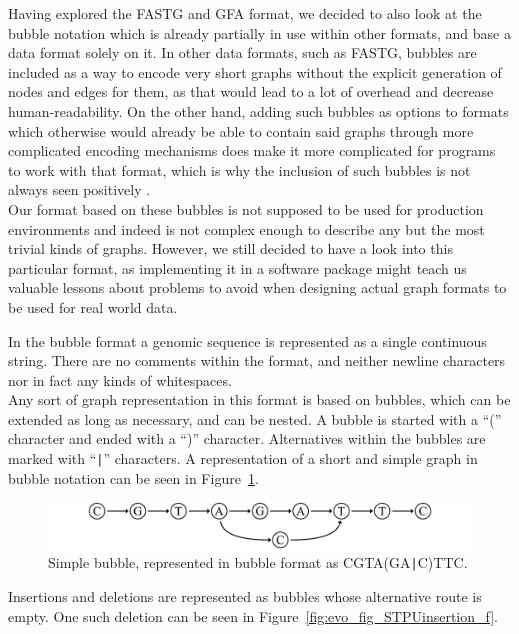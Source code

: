 \documentclass[a4paper,12pt,twoside,BCOR=10mm]{scrbook}
\def\pipe{\texttt{|}}
\begin{document}
Having explored the FASTG and GFA format, we decided to also look
at the bubble notation which is already partially in use within other formats,
and base a data format solely on it.
In other data formats, such as FASTG, bubbles are included as a way to encode very short graphs
without the explicit generation of nodes and edges for them,
as that would lead to a lot of overhead and decrease human-readability.
On the other hand, adding such bubbles as options to formats which otherwise
would already be able to contain said graphs through more complicated encoding mechanisms
does make it more complicated for programs to work with that format, which is why the inclusion
of such bubbles is not always seen positively \citep{specGFA1}. \\
Our format based on these bubbles
is not supposed to be used for production environments and indeed
is not complex enough to describe any but the most trivial kinds of graphs.
However, we still decided to have a look into this particular format,
as implementing it in a software package might teach us valuable lessons
about problems to avoid when designing actual graph formats to be used for real world data.

In the bubble format a genomic sequence is represented as a single continuous string.
There are no comments within the format,
and neither newline characters nor in fact any kinds of whitespaces. \\
Any sort of graph representation in this format is based on bubbles, which can be extended as long as necessary,
and can be nested. A bubble is started with a “(” character and ended
with a “)” character. Alternatives within the bubbles are marked with “{\!\pipe}”
characters.
A representation of a short and simple graph in bubble notation can be seen in Figure~\ref{fig:evo_fig_STPUbubble_f}.

\begin{figure}[!htb]
\centering
\includegraphics[width=\textwidth]{evo_fig_STPUbubble_f.pdf}
\caption[Simple bubble in bubble format]{Simple bubble, represented in bubble format as \textup{CGTA(GA\pipe C)TTC}.} \label{fig:evo_fig_STPUbubble_f}
\end{figure}

Insertions and deletions are represented as bubbles whose alternative route is empty.
One such deletion can be seen in Figure~\ref{fig:evo_fig_STPUinsertion_f}.
\end{document}
